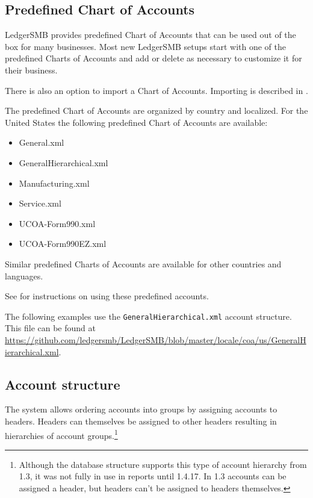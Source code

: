 \subsection{Predefined Chart of Accounts}
\label{sec-coa-predefined}

LedgerSMB provides predefined Chart of Accounts that can be used out of the box for many businesses.
Most new LedgerSMB setups start with one of the predefined Charts of Accounts and add or delete as necessary to customize it for their business.


There is also an option to import a Chart of Accounts. Importing is described in .

The predefined Chart of Accounts are organized by country and localized. For the United States the following predefined Chart of Accounts are available:
\begin{itemize}
    \item General.xml
    \item GeneralHierarchical.xml
    \item Manufacturing.xml
    \item Service.xml
    \item UCOA-Form990.xml
    \item UCOA-Form990EZ.xml
\end{itemize}

Similar predefined Charts of Accounts are available for other countries and languages.

See  for instructions on using these predefined accounts.

The following examples use the \texttt{GeneralHierarchical.xml} account structure.
This file can be found at \url{https://github.com/ledgersmb/LedgerSMB/blob/master/locale/coa/us/GeneralHierarchical.xml}.

\subsection{Account structure}
\label{sec-coa-accounts-structure}

The system allows ordering accounts into groups by assigning accounts to headers. Headers
can themselves be assigned to other headers resulting in hierarchies of account groups.\footnote{Although the
    database structure supports this type of account hierarchy from  1.3, it was not fully in use in reports until  1.4.17. In 1.3 accounts can be assigned a header,
    but headers can't be assigned to headers themselves.}

